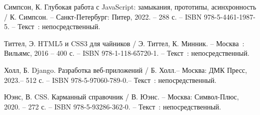 \begin{thebibliography}{9}
     Симпсон, К. Глубокая работа с JavaScript: замыкания, прототипы, асинхронность / К. Симпсон. – Санкт-Петербург: Питер, 2022. – 288 с. – ISBN 978-5-4461-1987-5. – Текст~: непосредственный.  
	
		Титтел, Э. HTML5 и CSS3 для чайников / Э. Титтел, К. Минник. – Москва~: Вильямс, 2016 – 400 с. – ISBN 978-1-118-65720-1. – Текст~: непосредственный.
	
		Холл, Б. Django. Разработка веб-приложений / Б. Холл.– Москва: ДМК Пресс, 2023.– 512 с. – ISBN 978-5-97060-789-0.– Текст~: непосредственный.
	
     Юэнс, В. CSS. Карманный справочник / В. Юэнс. – Москва: Символ-Плюс, 2020. – 272 с. – ISBN 978-5-93286-362-0. – Текст~: непосредственный.


\end{thebibliography}
